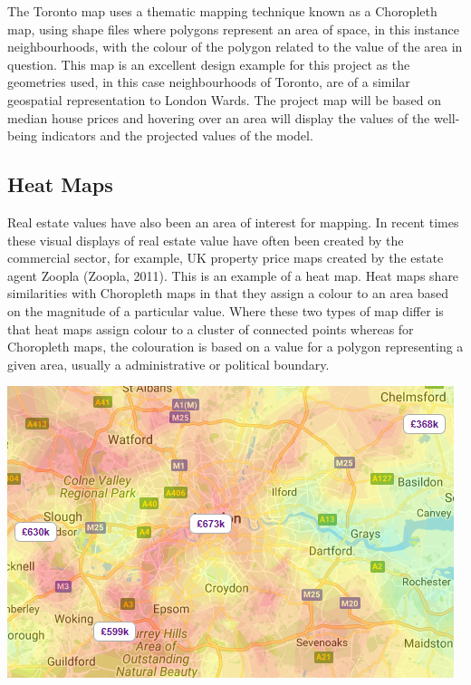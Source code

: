 The Toronto map uses a thematic mapping technique known as a Choropleth map, using shape files where polygons represent an area of space, in this instance neighbourhoods, with the colour of the polygon related to the value of the area in question.
This map is an excellent design example for this project as the geometries used, in this case neighbourhoods of Toronto, are of a similar geospatial representation to London Wards. The project map will be based on median house prices and hovering over an area will display the values of the well-being indicators and the projected values of the model.


\subsection{Heat Maps}
Real estate values have also been an area of interest for mapping. In recent times these visual displays of real estate value have often been created by the commercial sector, for example, UK property price maps created by the estate agent Zoopla (Zoopla, 2011). This is an example of a heat map.
Heat maps share similarities with Choropleth maps in that they assign a colour to an area based on the magnitude of a particular value. Where these two types of map differ is that heat maps assign colour to a cluster of connected points whereas for Choropleth maps, the colouration is based on a value for a polygon representing a given area, usually a administrative or political boundary.

\includegraphics[scale=1]{figures/zoopla_heat} %


